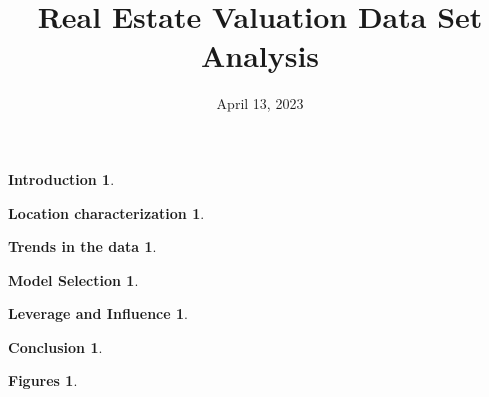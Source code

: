 \documentclass[hidelinks]{article}
\date{April 13, 2023}
\title{%
Real Estate Valuation Data Set Analysis }
\theoremstyle{break}
\renewcommand{\section}[2]{\theoremstyle{break} \newtheorem*{thm#1}{#1}\begin{thm#1}#2\end{thm#1}}
\begin{document}
\maketitle
\newpage
\section{Introduction}{}
\section{Location characterization}{}
\section{Trends in the data}{}
\section{Model Selection}{}
\newpage
\section{Leverage and Influence}{}
\section{Conclusion}{}
\newpage
\section{Figures}{}
\end{document}
